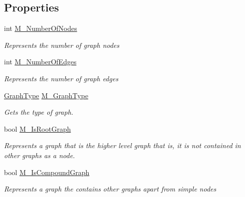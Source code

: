 \subsection*{Properties}
\begin{DoxyCompactItemize}
\item 
int \hyperlink{class_graph_library_1_1_c_graph_a77c0f98b93196dd167a2b0bfcd4ae6fb}{M\+\_\+\+Number\+Of\+Nodes}
\begin{DoxyCompactList}\small\item\em Represents the number of graph nodes \end{DoxyCompactList}\item 
int \hyperlink{class_graph_library_1_1_c_graph_a984f5731db28443874a6a6ba6a8ad824}{M\+\_\+\+Number\+Of\+Edges}
\begin{DoxyCompactList}\small\item\em Represents the number of graph edges \end{DoxyCompactList}\item 
\hyperlink{namespace_graph_library_1_1_generics_a1bac729ea88e6f3925406df33f15d056}{Graph\+Type} \hyperlink{class_graph_library_1_1_c_graph_a705c73461dfec01d7ee91e8dc62d082f}{M\+\_\+\+Graph\+Type}
\begin{DoxyCompactList}\small\item\em Gets the type of graph. \end{DoxyCompactList}\item 
bool \hyperlink{class_graph_library_1_1_c_graph_a262016f2855aac75e0b5611a26f149a8}{M\+\_\+\+Is\+Root\+Graph}
\begin{DoxyCompactList}\small\item\em Represents a graph that is the higher level graph that is, it is not contained in other graphs as a node. \end{DoxyCompactList}\item 
bool \hyperlink{class_graph_library_1_1_c_graph_a6773626813d807a0d4db0ab860baad9e}{M\+\_\+\+Is\+Compound\+Graph}
\begin{DoxyCompactList}\small\item\em Represents a graph the contains other graphs apart from simple nodes \end{DoxyCompactList}\end{DoxyCompactItemize}
